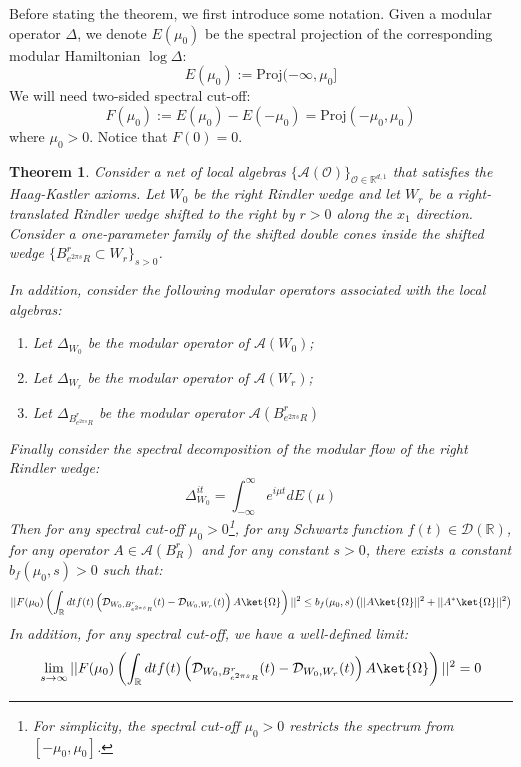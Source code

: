 \documentclass[a4paper,11pt]{article}
\newtheorem{theorem}{Theorem}
\theoremstyle{definition}
\theoremstyle{remark}
\newcommand{\lb}{\left(}
\newcommand{\rb}{\right)}
\begin{document}
Before stating the theorem, we first introduce some notation. Given a modular operator $\Delta$, we denote $E(\mu_0)$ be the spectral projection of the corresponding modular Hamiltonian $\log\Delta$:
\begin{equation}
    E(\mu_0) := \text{Proj}(-\infty, \mu_0]
\end{equation}
We will need two-sided spectral cut-off:
\begin{equation}
    F(\mu_0) := E(\mu_0) - E(-\mu_0) = \text{Proj}(-\mu_0, \mu_0)
\end{equation}
where $\mu_0 > 0$. Notice that $F(0) = 0$. 
\begin{theorem}\label{theorem:mainresult}
    Consider a net of local algebras $\{\mathcal{A}(\mathcal{O})\}_{\mathcal{O}\in\mathbb{R}^{d,1}}$ that satisfies the Haag-Kastler axioms. Let $W_0$ be the right Rindler wedge and let $W_r$ be a right-translated Rindler wedge shifted to the right by $r > 0$ along the $x_1$ direction. Consider a one-parameter family of the shifted double cones inside the shifted wedge $\{B^r_{e^{2\pi s}R} \subset W_r\}_{s > 0}$. 
    
    In addition, consider the following modular operators associated with the local algebras:
    \begin{enumerate}
        \item Let $\Delta_{W_0}$ be the modular operator of $\mathcal{A}(W_0)$;
        \item Let $\Delta_{W_r}$ be the modular operator of $\mathcal{A}(W_r)$;
        \item Let $\Delta_{B^r_{e^{2\pi s}R}}$ be the modular operator $\mathcal{A}(B^r_{e^{2\pi s}R})$
    \end{enumerate}
    Finally consider the spectral decomposition of the modular flow of the right Rindler wedge:
    \begin{equation}
        \Delta_{W_0}^{it} = \int_{-\infty}^\infty e^{i\mu t} dE(\mu)
    \end{equation}
    Then for any spectral cut-off $\mu_0 > 0$\footnote{For simplicity, the spectral cut-off $\mu_0 > 0$ restricts the spectrum from $[-\mu_0, \mu_0]$.}, for any Schwartz function $f(t)\in \mathcal{D}(\mathbb{R})$, for any operator $A\in \mathcal{A}(B^r_R)$ and for any constant $s > 0$, there exists a constant $b_f(\mu_0, s) > 0$ such that:
    \begin{equation}
        ||F(\mu_0)\lb\int_\mathbb{R} dtf(t)\lb\mathcal{D}_{W_0, B^r_{e^{2\pi s}R}}(t) - \mathcal{D}_{W_0, W_r}(t)\rb A\ket{\Omega}\rb||^2 \leq b_f(\mu_0, s)\lb||A\ket{\Omega}||^2 + ||A^*\ket{\Omega}||^2\rb
    \end{equation}
    In addition, for any spectral cut-off, we have a well-defined limit:
    \begin{equation}
        \lim_{s\rightarrow \infty}||F(\mu_0)\lb\int_\mathbb{R} dt f(t)\lb\mathcal{D}_{W_0, B^r_{e^{2\pi s}R}}(t) - \mathcal{D}_{W_0, W_r}(t)\rb A\ket{\Omega}\rb||^2 = 0
    \end{equation}
\end{theorem}
\end{document}
